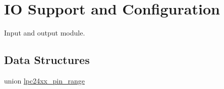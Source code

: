 \hypertarget{group__lpc24xx__io}{}\section{IO Support and Configuration}
\label{group__lpc24xx__io}


Input and output module.  


\subsection*{Data Structures}
\begin{DoxyCompactItemize}
\item 
union \mbox{\hyperlink{unionlpc24xx__pin__range}{lpc24xx\+\_\+pin\+\_\+range}}
\end{DoxyCompactItemize}
